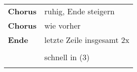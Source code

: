 \begin{tabular}{p{1.6cm}l}
	\textbf{Chorus} & ruhig, Ende steigern                                \\
	\textbf{Chorus} & wie vorher                                          \\
	\textbf{Ende}   & letzte Zeile insgesamt 2x                           \\
	                &                                                     \\
	                & schnell in (3)                                       \\
	                &                                                     \\
\end{tabular}
